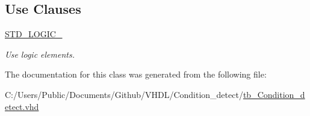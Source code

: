 \subsection*{Use Clauses}
 \begin{DoxyCompactItemize}
\item 
\hyperlink{classtb___condition__detect_aa4b2b25246a821511120e3149b003563}{S\+T\+D\+\_\+\+L\+O\+G\+I\+C\+\_}   \hypertarget{classtb___condition__detect_aa4b2b25246a821511120e3149b003563}{}\label{classtb___condition__detect_aa4b2b25246a821511120e3149b003563}

\begin{DoxyCompactList}\small\item\em Use logic elements. \end{DoxyCompactList}\end{DoxyCompactItemize}


The documentation for this class was generated from the following file\+:\begin{DoxyCompactItemize}
\item 
C\+:/\+Users/\+Public/\+Documents/\+Github/\+V\+H\+D\+L/\+Condition\+\_\+detect/\hyperlink{tb___condition__detect_8vhd}{tb\+\_\+\+Condition\+\_\+detect.\+vhd}\end{DoxyCompactItemize}
